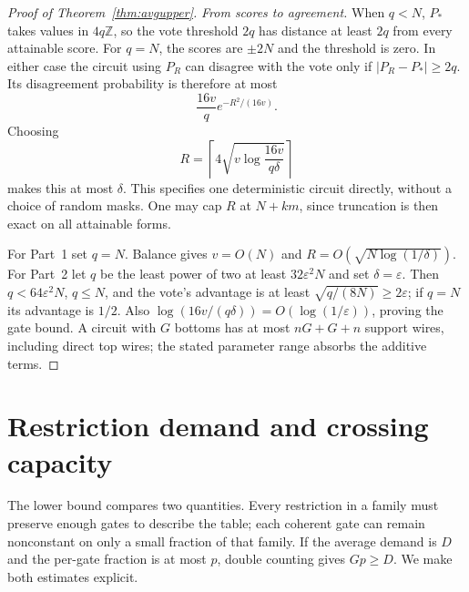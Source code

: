 \documentclass[11pt]{article}
\begin{document}
\begin{proof}[Proof of Theorem~\ref{thm:avgupper}]
\emph{From scores to agreement.}
When $q<N$, $P_*$ takes values in $4q\mathbb Z$, so the vote threshold
$2q$ has distance at least $2q$ from every attainable score.
For $q=N$, the scores are $\pm2N$ and the threshold is zero.
In either case the circuit using $P_R$ can disagree with the vote only
if $|P_R-P_*|\ge2q$. Its disagreement probability is therefore at most
$$
\frac{16v}{q}e^{-R^2/(16v)}.
$$
Choosing
$$R=\left\lceil4\sqrt{v\log\frac{16v}{q\delta}}\right\rceil$$
makes this at most $\delta$. This specifies one deterministic circuit
directly, without a choice of random masks. One may cap $R$ at $N+km$,
since truncation is then exact on all attainable forms.

For Part~1 set $q=N$. Balance gives $v=O(N)$ and
$R=O(\sqrt{N\log(1/\delta)})$. For Part~2 let $q$ be the least power of
two at least $32\varepsilon^2N$ and set $\delta=\varepsilon$.
Then $q<64\varepsilon^2N$, $q\le N$, and the vote's advantage is at least
$\sqrt{q/(8N)}\ge2\varepsilon$; if $q=N$ its advantage is $1/2$.
Also $\log(16v/(q\delta))=O(\log(1/\varepsilon))$, proving the gate bound.
A circuit with $G$ bottoms has at most $nG+G+n$ support wires, including
direct top wires; the stated parameter range absorbs the additive terms.
\end{proof}

\section{Restriction demand and crossing capacity}\label{sec:coherent}
The lower bound compares two quantities. Every restriction in a family
must preserve enough gates to describe the table; each coherent gate
can remain nonconstant on only a small fraction of that family.
If the average demand is $D$ and the per-gate fraction is at most $p$,
double counting gives $Gp\ge D$. We make both estimates explicit.
\end{document}
